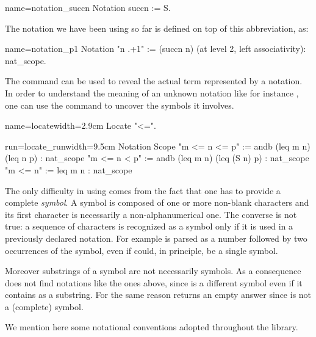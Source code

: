 \begin{coq}{name=notation_succn}{}
Notation succn := S.
\end{coq}

The notation  we have been using so far is defined on top of
this abbreviation, as:

\begin{coq}{name=notation_p1}{}
Notation "n .+1" := (succn n) (at level 2, left associativity): nat_scope.
\end{coq}


The  command can be used to reveal the actual term
represented by a notation.  In order to understand the meaning of an unknown notation like for instance , one can use the  command to uncover the symbols it involves.

\begin{coq}{name=locate}{width=2.9cm}
Locate "<=".
\end{coq}
\begin{coqout}{run=locate_run}{width=9.5cm}
Notation                                       Scope
"m <= n <= p" := andb (leq m n) (leq n p)    : nat_scope
"m <= n < p" := andb (leq m n) (leq (S n) p) : nat_scope
"m <= n" := leq m n                          : nat_scope
\end{coqout}

The only difficulty in using  comes from the fact
that one has to provide a complete \emph{symbol}.  A symbol
is composed of one or more non-blank characters and its first
character is necessarily a non-alphanumerical one.
The converse is not true: a sequence of characters is recognized as
a symbol only if it is used in a previously declared notation.
For example  is parsed as a number followed by two
occurrences of the  symbol, even if  could, in
principle, be a single symbol.

Moreover substrings of a symbol are not necessarily symbols.  As a consequence
 does not find notations like the ones above, since \C{<=} is a
different symbol even if it contains \C{=} as a substring.  For the same reason
 returns an empty answer since  is not a (complete)
symbol.

We mention here some notational conventions
adopted throughout the \mcbMC{} library.


